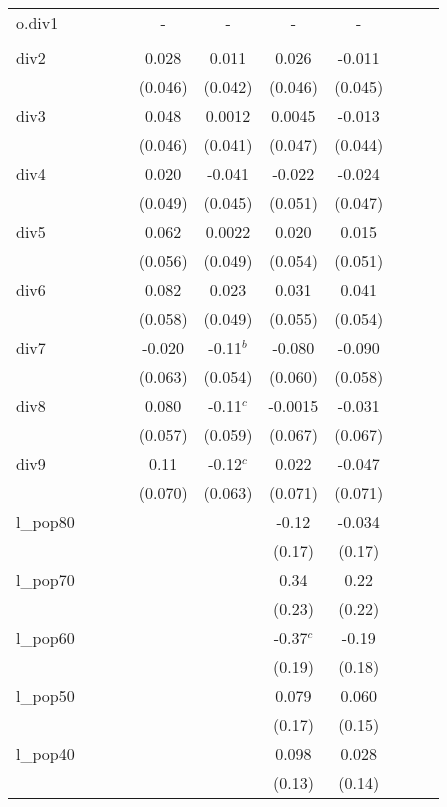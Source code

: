 \documentclass[]{article}
\begin{document}
\begin{tabular}{lcccccccccc}
o.div1 &  &  &  & - & - & - & - &  &  &  \\
 &  &  &  &  &  &  &  &  &  &  \\
div2 &  &  &  & 0.028 & 0.011 & 0.026 & -0.011 &  &  &  \\
 &  &  &  & (0.046) & (0.042) & (0.046) & (0.045) &  &  &  \\
div3 &  &  &  & 0.048 & 0.0012 & 0.0045 & -0.013 &  &  &  \\
 &  &  &  & (0.046) & (0.041) & (0.047) & (0.044) &  &  &  \\
div4 &  &  &  & 0.020 & -0.041 & -0.022 & -0.024 &  &  &  \\
 &  &  &  & (0.049) & (0.045) & (0.051) & (0.047) &  &  &  \\
div5 &  &  &  & 0.062 & 0.0022 & 0.020 & 0.015 &  &  &  \\
 &  &  &  & (0.056) & (0.049) & (0.054) & (0.051) &  &  &  \\
div6 &  &  &  & 0.082 & 0.023 & 0.031 & 0.041 &  &  &  \\
 &  &  &  & (0.058) & (0.049) & (0.055) & (0.054) &  &  &  \\
div7 &  &  &  & -0.020 & -0.11$^b$ & -0.080 & -0.090 &  &  &  \\
 &  &  &  & (0.063) & (0.054) & (0.060) & (0.058) &  &  &  \\
div8 &  &  &  & 0.080 & -0.11$^c$ & -0.0015 & -0.031 &  &  &  \\
 &  &  &  & (0.057) & (0.059) & (0.067) & (0.067) &  &  &  \\
div9 &  &  &  & 0.11 & -0.12$^c$ & 0.022 & -0.047 &  &  &  \\
 &  &  &  & (0.070) & (0.063) & (0.071) & (0.071) &  &  &  \\
l\_pop80 &  &  &  &  &  & -0.12 & -0.034 &  &  &  \\
 &  &  &  &  &  & (0.17) & (0.17) &  &  &  \\
l\_pop70 &  &  &  &  &  & 0.34 & 0.22 &  &  &  \\
 &  &  &  &  &  & (0.23) & (0.22) &  &  &  \\
l\_pop60 &  &  &  &  &  & -0.37$^c$ & -0.19 &  &  &  \\
 &  &  &  &  &  & (0.19) & (0.18) &  &  &  \\
l\_pop50 &  &  &  &  &  & 0.079 & 0.060 &  &  &  \\
 &  &  &  &  &  & (0.17) & (0.15) &  &  &  \\
l\_pop40 &  &  &  &  &  & 0.098 & 0.028 &  &  &  \\
 &  &  &  &  &  & (0.13) & (0.14) &  &  &  \\

\end{tabular}
\end{document}
